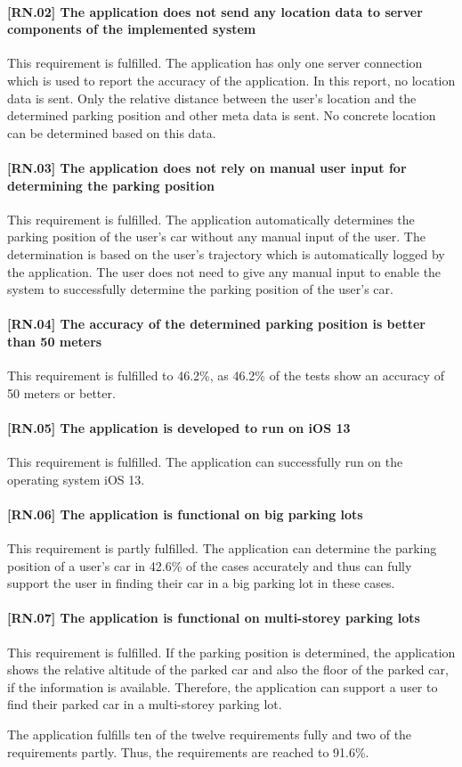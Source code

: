 \paragraph{[RN.02] The application does not send any location data to server components of the implemented system}
This requirement is fulfilled. The application has only one server connection which is used to report the accuracy of the application. In this report, no location data is sent. Only the relative distance between the user's location and the determined parking position and other meta data is sent. No concrete location can be determined based on this data.

\paragraph{[RN.03] The application does not rely on manual user input for determining the parking position}
This requirement is fulfilled. The application automatically determines the parking position of the user's car without any manual input of the user. The determination is based on the user's trajectory which is automatically logged by the application. The user does not need to give any manual input to enable the system to successfully determine the parking position of the user's car. 

\paragraph{[RN.04] The accuracy of the determined parking position is better than 50 meters}
This requirement is fulfilled to 46.2\%, as 46.2\% of the tests show an accuracy of 50 meters or better.

\paragraph{[RN.05] The application is developed to run on iOS 13}
This requirement is fulfilled. The application can successfully run on the operating system iOS 13.

\paragraph{[RN.06] The application is functional on big parking lots}
This requirement is partly fulfilled. The application can determine the parking position of a user's car in 42.6\% of the cases accurately and thus can fully support the user in finding their car in a big parking lot in these cases. 

\paragraph{[RN.07] The application is functional on multi-storey parking lots}
This requirement is fulfilled. If the parking position is determined, the application shows the relative altitude of the parked car and also the floor of the parked car, if the information is available. Therefore, the application can support a user to find their parked car in a multi-storey parking lot.

The application fulfills ten of the twelve requirements fully and two of the requirements partly. Thus, the requirements are reached to 91.6\%. 
